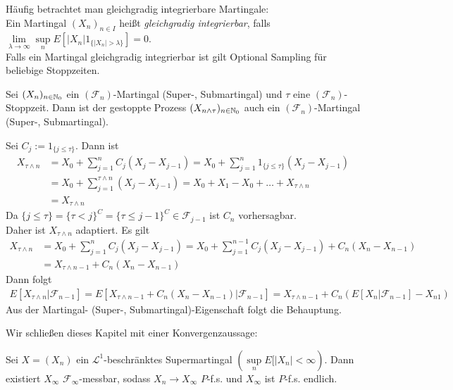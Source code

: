 \documentclass[a4paper,twoside,DIV15,BCOR12mm]{scrbook}
\newcommand{\cF}{\mathcal F}
\begin{document}
\begin{bemerkung}
Häufig betrachtet man gleichgradig integrierbare Martingale:\\
Ein Martingal $(X_n)_{n\in I}$ heißt \textit{gleichgradig integrierbar}, falls $\lim\limits_{\lambda\to\infty}\sup\limits_n E[|X_n| 1_{\{|X_n|>\lambda\}}]=0$.\\
Falls ein Martingal gleichgradig integrierbar ist gilt Optional Sampling für beliebige Stoppzeiten.
\end{bemerkung}

\begin{satz}
Sei $(X_n)_{n\in\mathbb{N}_0}$ ein $(\cF_n)$-Martingal (Super-, Submartingal) und $\tau$ eine $(\cF_n)$-Stoppzeit. Dann ist der gestoppte Prozess $(X_{n\wedge\tau})_{n\in\mathbb{N}_0}$ auch ein $(\cF_n)$-Martingal (Super-, Submartingal).
\end{satz}
\begin{beweis}
Sei $C_j:=1_{\{j\leq \tau\}}$. Dann ist
\begin{align*}
X_{\tau\wedge n}&=X_0+\sum\limits_{j=1}^n C_j (X_j-X_{j-1})=X_0+\sum\limits_{j=1}^n1_{\{j\leq\tau\}}(X_j-X_{j-1})\\
&=X_0+\sum\limits_{j=1}^{\tau\wedge n}(X_j-X_{j-1})=X_0+X_1-X_0+\ldots+X_{\tau\wedge n}\\
&= X_{\tau\wedge n}
\end{align*}
Da $\{j\leq\tau\}=\{\tau<j\}^C=\{\tau\leq j-1\}^C \in \cF_{j-1}$ ist $C_n$ vorhersagbar.\\
Daher ist $X_{\tau\wedge n}$ adaptiert. Es gilt
\begin{align*}
X_{\tau\wedge n}&=X_0+\sum\limits_{j=1}^n C_j (X_j-X_{j-1})=X_0+\sum\limits_{j=1}^{n-1}C_j(X_j-X_{j-1})+C_n(X_n-X_{n-1})\\
&= X_{\tau\wedge n-1}+C_n(X_n-X_{n-1})
\end{align*}
Dann folgt 
\begin{align*}
E[X_{\tau\wedge n}|\cF_{n-1}]=E[X_{\tau\wedge n-1}+C_n(X_n-X_{n-1})|\cF_{n-1}]=X_{\tau\wedge n-1}+C_n(E[X_n|\cF_{n-1}]-X_{n1})
\end{align*}
Aus der Martingal- (Super-, Submartingal)-Eigenschaft folgt die Behauptung.
\end{beweis}
Wir schließen dieses Kapitel mit einer Konvergenzaussage:
\begin{satz}Sei $X=(X_n)$ ein $\mathcal{L}^1$-beschränktes Supermartingal $(\sup\limits_n E[|X_n|<\infty)$. Dann existiert $X_\infty$ $\cF_\infty$-messbar, sodass $X_n\to X_\infty$ $P$-f.s. und $X_\infty$ ist $P$-f.s. endlich.
\end{satz}
\end{document}
